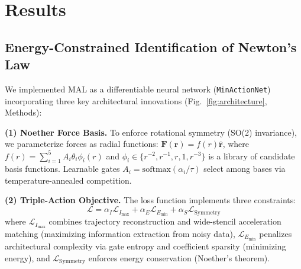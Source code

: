 \documentclass[9pt,twocolumn,twoside]{pnas-new}
\begin{document}
\section*{Results}

\subsection*{Energy-Constrained Identification of Newton's Law}
We implemented MAL as a differentiable neural network (\texttt{MinActionNet}) incorporating three key architectural innovations (Fig.~\ref{fig:architecture}, Methods):

\textbf{(1) Noether Force Basis.} To enforce rotational symmetry (SO(2) invariance), we parameterize forces as radial functions: $\mathbf{F}(\mathbf{r}) = f(r)\hat{\mathbf{r}}$, where $f(r) = \sum_{i=1}^5 A_i \theta_i \phi_i(r)$ and $\phi_i \in \{r^{-2}, r^{-1}, r, 1, r^{-3}\}$ is a library of candidate basis functions. Learnable gates $A_i = \mathrm{softmax}(\alpha_i/\tau)$ select among bases via temperature-annealed competition.

\textbf{(2) Triple-Action Objective.} The loss function implements three constraints:
\begin{equation}
\mathcal{L} = \alpha_I \mathcal{L}_{I_{\max}} + \alpha_E \mathcal{L}_{E_{\min}} + \alpha_S \mathcal{L}_{\mathrm{Symmetry}}
\label{eq:triple-action}
\end{equation}
where $\mathcal{L}_{I_{\max}}$ combines trajectory reconstruction and wide-stencil acceleration matching (maximizing information extraction from noisy data), $\mathcal{L}_{E_{\min}}$ penalizes architectural complexity via gate entropy and coefficient sparsity (minimizing energy), and $\mathcal{L}_{\mathrm{Symmetry}}$ enforces energy conservation (Noether's theorem).
\end{document}
